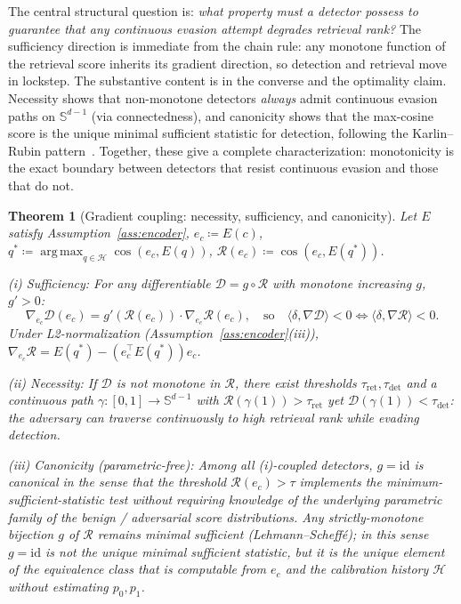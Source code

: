 \documentclass{article}
\newtheorem{theorem}{Theorem}
\theoremstyle{definition}
\newcommand{\cH}{\mathcal{H}}
\newcommand{\cR}{\mathcal{R}}
\newcommand{\cD}{\mathcal{D}}
\newcommand{\enc}{E}
\DeclareMathOperator*{\argmax}{arg\,max}
\DeclareMathOperator{\cosim}{cos}
\begin{document}
The central structural question is: \emph{what property must a detector possess to guarantee that any continuous evasion attempt degrades retrieval rank?}
The sufficiency direction is immediate from the chain rule: any monotone function of the retrieval score inherits its gradient direction, so detection and retrieval move in lockstep. The substantive content is in the converse and the optimality claim. Necessity shows that non-monotone detectors \emph{always} admit continuous evasion paths on $\mathbb{S}^{d-1}$ (via connectedness), and canonicity shows that the max-cosine score is the unique minimal sufficient statistic for detection, following the Karlin--Rubin pattern~\citep{lehmann1959testing}. Together, these give a complete characterization: monotonicity is the exact boundary between detectors that resist continuous evasion and those that do not.

\begin{theorem}[Gradient coupling: necessity, sufficiency, and canonicity]
\label{thm:gradient_coupling}
Let $\enc$ satisfy Assumption~\ref{ass:encoder}, $e_c \coloneqq \enc(c)$, $q^* \coloneqq \argmax_{q \in \cH} \cosim(e_c, \enc(q))$, $\cR(e_c) \coloneqq \cosim(e_c, \enc(q^*))$.

\emph{(i) Sufficiency:} For any differentiable $\cD = g \circ \cR$ with monotone increasing $g$, $g' > 0$:
\begin{equation}
  \nabla_{e_c} \cD(e_c) = g'(\cR(e_c)) \cdot \nabla_{e_c} \cR(e_c),
  \quad \text{so} \quad
  \langle \delta, \nabla \cD \rangle < 0 \iff \langle \delta, \nabla \cR \rangle < 0.
  \label{eq:gradient}
\end{equation}
Under L2-normalization (Assumption~\ref{ass:encoder}(iii)), $\nabla_{e_c}\cR = \enc(q^*) - (e_c^\top\enc(q^*))e_c$.

\emph{(ii) Necessity:} If $\cD$ is \emph{not} monotone in $\cR$, there exist thresholds $\tau_{\text{ret}}, \tau_{\text{det}}$ and a continuous path $\gamma: [0,1] \to \mathbb{S}^{d-1}$ with $\cR(\gamma(1)) > \tau_{\text{ret}}$ yet $\cD(\gamma(1)) < \tau_{\text{det}}$: the adversary can traverse continuously to high retrieval rank while evading detection.

\emph{(iii) Canonicity (parametric-free):} Among all (i)-coupled detectors, $g = \mathrm{id}$ is canonical in the sense that the threshold $\cR(e_c) > \tau$ implements the minimum-sufficient-statistic test \emph{without requiring knowledge of the underlying parametric family} of the benign / adversarial score distributions. Any strictly-monotone bijection $g$ of $\cR$ remains minimal sufficient (Lehmann--Scheff\'{e}); in this sense $g = \mathrm{id}$ is not \emph{the} unique minimal sufficient statistic, but it is the unique element of the equivalence class that is computable from $e_c$ and the calibration history $\cH$ without estimating $p_0, p_1$.
\end{theorem}
\end{document}
